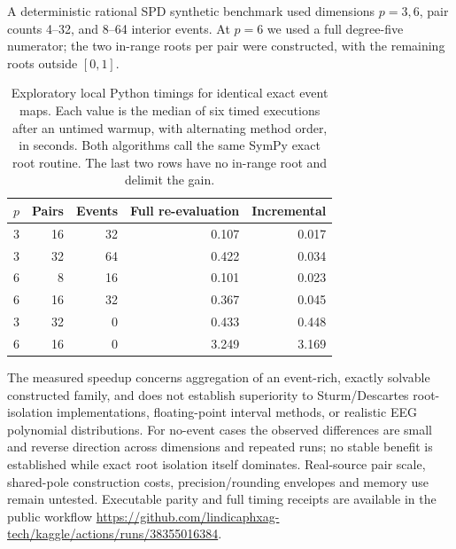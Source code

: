 A deterministic rational SPD synthetic benchmark used dimensions
$p=3,6$, pair counts 4--32, and 8--64 interior events. At $p=6$
we used a full degree-five numerator; the two in-range roots per
pair were constructed, with the remaining roots outside $[0,1]$.

\begin{table}[ht]\centering\small
\caption{Exploratory local Python timings for identical exact event maps.
Each value is the median of six timed executions after an untimed
warmup, with alternating method order, in seconds. Both
algorithms call the same SymPy exact root routine. The last two
rows have no in-range root and delimit the gain.}
\label{tab:p4-incremental-events}
\begin{tabular}{rrrrr}\toprule
$p$ & Pairs & Events & Full re-evaluation & Incremental\\\midrule
3 & 16 & 32 & 0.107 & 0.017\\
3 & 32 & 64 & 0.422 & 0.034\\
6 & 8 & 16 & 0.101 & 0.023\\
6 & 16 & 32 & 0.367 & 0.045\\
3 & 32 & 0 & 0.433 & 0.448\\
6 & 16 & 0 & 3.249 & 3.169\\
\bottomrule\end{tabular}
\end{table}

The measured speedup concerns aggregation of an event-rich, exactly
solvable constructed family, and does not establish superiority to
Sturm/Descartes root-isolation implementations, floating-point
interval methods, or realistic EEG polynomial distributions.
For no-event cases the observed differences are small and reverse
direction across dimensions and repeated runs; no stable benefit is
established while exact root isolation itself dominates. Real-source pair scale,
shared-pole construction costs, precision/rounding envelopes and
memory use remain untested. Executable parity and full timing
receipts are available in the public workflow
\url{https://github.com/lindicaphxag-tech/kaggle/actions/runs/38355016384}.
